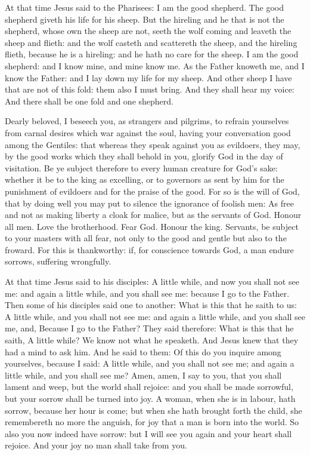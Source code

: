 
At that time Jesus said to the Pharisees: I am the good shepherd. The good shepherd giveth his life for his sheep.  But
the hireling and he that is not the shepherd, whose own the sheep are not,
seeth the wolf coming and leaveth the sheep and flieth: and the wolf casteth
and scattereth the sheep, and the hireling flieth, because he is a hireling:
and he hath no care for the sheep.  I am the good shepherd: and I know mine,
and mine know me.  As the Father knoweth me, and I know the Father: and I lay
down my life for my sheep.  And other sheep I have that are not of this fold:
them also I must bring. And they shall hear my voice: And there shall be one
fold and one shepherd.






Dearly beloved, I beseech you, as strangers and pilgrims, to refrain yourselves
from carnal desires which war against the soul, having your conversation good
among the Gentiles: that whereas they speak against you as evildoers, they may,
by the good works which they shall behold in you, glorify God in the day of
visitation.  Be ye subject therefore to every human creature for God's sake:
whether it be to the king as excelling, or to governors as sent by him for the
punishment of evildoers and for the praise of the good.  For so is the will of
God, that by doing well you may put to silence the ignorance of foolish men: As
free and not as making liberty a cloak for malice, but as the servants of God.
Honour all men. Love the brotherhood. Fear God. Honour the king.  Servants, be
subject to your masters with all fear, not only to the good and gentle but also
to the froward.  For this is thankworthy: if, for conscience towards God, a man
endure sorrows, suffering wrongfully.



At that time Jesus said to his disciples: 
A little while, and now you shall not see me: and again a little while, and you
shall see me: because I go to the Father.  Then some of his disciples said one
to another: What is this that he saith to us: A little while, and you shall not
see me: and again a little while, and you shall see me, and, Because I go to
the Father?  They said therefore: What is this that he saith, A little while?
We know not what he speaketh.  And Jesus knew that they had a mind to ask him.
And he said to them: Of this do you inquire among yourselves, because I said: A
little while, and you shall not see me; and again a little while, and you shall
see me?  Amen, amen, I say to you, that you shall lament and weep, but the
world shall rejoice: and you shall be made sorrowful, but your sorrow shall be
turned into joy.  A woman, when she is in labour, hath sorrow, because her hour
is come; but when she hath brought forth the child, she remembereth no more the
anguish, for joy that a man is born into the world.  So also you now indeed
have sorrow: but I will see you again and your heart shall rejoice. And your
joy no man shall take from you.


